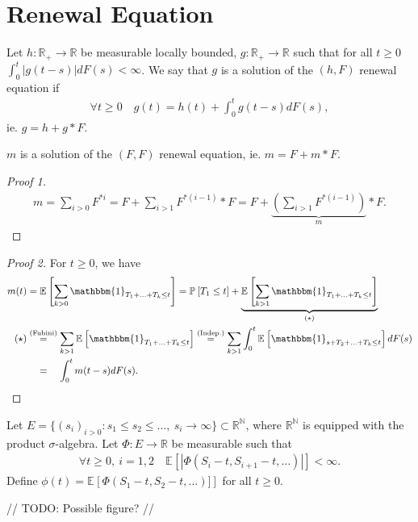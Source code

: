 \section{Renewal Equation}

\begin{defn}
	Let $h:\mathbb{R}_+ \to \mathbb{R}$ be measurable locally bounded, $g:\mathbb{R}_+ \to \mathbb{R}$ such that for all $t\geq 0$ $\int_{0}^{t} |g(t-s)|dF(s) <\infty$. We say that $g$ is a solution of the $(h,F)$ renewal equation if
\begin{align}
	\boxed{ \forall t\geq 0 \quad g(t) = h(t) + \int_{0}^{t} g(t-s)dF(s) ,}
\end{align}
ie. $g=h+g*F$.
\end{defn}

\begin{prop}[]
	$m$ is a solution of the $(F,F)$ renewal equation, ie. $m=F+m*F$.	
\end{prop}
\begin{proof}[Proof 1]
\begin{align}
	m = \sum_{i> 0}^{} F^{*i} = F + \sum_{i> 1}^{} F^{*(i-1)}*F = F + \underbrace{\left( \sum_{i> 1}^{} F^{*(i-1)} \right)}_{m}*F.
\end{align}
\end{proof}
\begin{proof}[Proof 2]
For $t\geq 0$, we have
\begin{align}
	m(t)& = \mathbb{E}_{} \left[ \sum_{k> 0}^{} \mathbbm{1}_{T_1 + \ldots + T_k \leq t}  \right] = \mathbb{P}_{} \left[ T_1 \leq t \right] + \underbrace{\mathbb{E}_{} \left[ \sum_{k> 1}^{}\mathbbm{1}_{T_1 + \ldots + T_k \leq t}   \right]}_{(\star)} \\ 
	(\star) &\stackrel{\textrm{(Fubini)}}{=} \sum_{k> 1}^{} \mathbb{E}_{} \left[ \mathbbm{1}_{T_1 + \ldots + T_k \leq t}  \right] \stackrel{\textrm{(Indep.)}}{=} \sum_{k> 1}^{} \int_{0}^{t} \mathbb{E}_{} \left[ \mathbbm{1}_{s+T_2+\ldots+T_k \leq t}  \right] dF(s) \\
		&\stackrel{\textrm{\phantom{(Fubini)}}}{=} \int_{0}^{t} m(t-s)dF(s).
\end{align}
\end{proof}

\begin{ex}[Generalization]
	Let $E= \{ (s_i)_{i> 0}: s_1 \leq s_2\leq \ldots,\ s_{i}\to \infty\} \subset \mathbb{R}^{\mathbb{N}}$, where $\mathbb{R}^{\mathbb{N}}$ is equipped with the product $\sigma$-algebra.
	Let $\Phi:E \to \mathbb{R}$ be measurable such that
	\begin{align}
		\forall t\geq 0,\ i=1,2 \quad \mathbb{E}_{} \left[ | \Phi(S_i-t, S_{i+1}-t,\ldots)| \right] < \infty.
	\end{align}
	Define $\phi(t)=\mathbb{E}_{} \left[ \Phi(S_1-t, S_2-t,\ldots)] \right] $ for all $t\geq 0$.	
\end{ex}
{\color{blue} // TODO: Possible figure? //}

